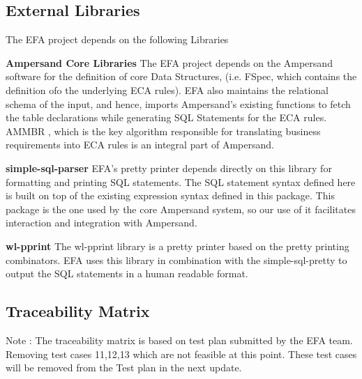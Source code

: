 \documentclass[12pt, svgnames]{article}
\let\Oldsubsection\subsection
\renewcommand{\subsection}{\FloatBarrier\Oldsubsection}
\begin{document}
\subsection{External Libraries}
The EFA project depends on the following Libraries 
\begin{description}
	\item \textbf{Ampersand Core Libraries} \newline
		The EFA project depends on the Ampersand software for the definition of 
		core Data Structures, (i.e. FSpec, which contains the definition ofo 
		the underlying ECA rules). EFA also maintains the relational schema of 
		the input, and hence, imports Ampersand's existing functions to fetch 
		the table declarations while generating SQL Statements for the ECA 
		rules. AMMBR \cite{AMMBR}, which is the key algorithm responsible for 
		translating business requirements into ECA rules is an integral part of 
		Ampersand.
	\item \textbf{simple-sql-parser} \newline
		EFA's pretty printer depends directly on this library for formatting 
		and printing SQL statements. The SQL statement syntax 
                defined here is built on top of the existing expression syntax defined 
                in this package. This package is the one used by the core Ampersand system,
                so our use of it facilitates interaction and integration with Ampersand. \cite{simple-sql}
	\item \textbf{wl-pprint} \newline 
          The wl-pprint library\cite{wl-pprint} is a pretty printer based on the
          pretty printing combinators. EFA uses this library in combination with
          the simple-sql-pretty to output the SQL statements in a human readable
          format.
	\item 
\end{description}

\subsection{Traceability Matrix} \label{SecTM}

Note : The traceability matrix is based on test plan submitted by the EFA team. Removing test cases 11,12,13 which are not feasible at this point. These test cases will be removed from the Test plan in the next update.
\end{document}
